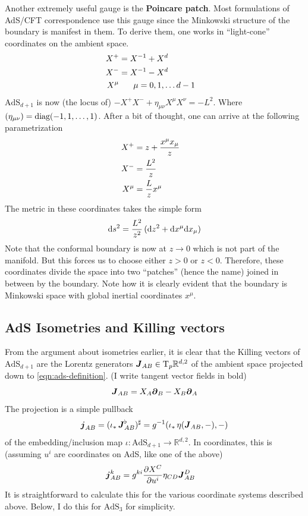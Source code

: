 \documentclass[a4paper,12pt]{article}
\begin{document}
      Another extremely useful gauge is the \textbf{Poincare patch}. Most formulations of AdS/CFT correspondence use this gauge since the Minkowski structure of the boundary is manifest in them. To derive them, one works in ``light-cone'' coordinates on the ambient space.
      \begin{align}
         X^+ &= X^{-1} + X^d \cr
         X^- &= X^{-1} - X^d \cr
         X^\mu &\hspace{0.05\linewidth} \mu = 0, 1, \ldots d-1
      \end{align}
      $\text{AdS}_{d+1}$ is now (the locus of) $-X^{+}X^{-} + \eta_{\mu \nu} X^\mu X^\nu = -L^2$. Where $(\eta_{\mu \nu}) = \hbox{\rm diag} (-1, 1, \ldots, 1)$.
      After a bit of thought, one can arrive at the following parametrization
      \begin{align}
         X^{+} &= z + \frac{x^\mu x_\mu}{z} \cr
         X^{-} &= \frac{L^2}{z} \cr
         X^{\mu} &= \frac{L}{z} x^\mu
      \end{align}
      The metric in these coordinates takes the simple form
      \begin{equation}
         \text{d} s^2 = \frac{L^2}{z^2} \, (\text{d} z^2 + \text{d} x^\mu \text{d} x_\mu)
      \end{equation}
      Note that the conformal boundary is now at $z \to 0$ which is not part of the manifold. But this forces us to choose either $z > 0$ or $z < 0$. Therefore, these coordinates divide the space into two ``patches'' (hence the name) joined in between by the boundary.
      Note how it is clearly evident that the boundary is Minkowski space with global inertial coordinates $x^\mu$.

   \subsection{AdS Isometries and Killing vectors}
      From the argument about isometries earlier, it is clear that the Killing vectors of $\text{AdS}_{d+1}$ are the Lorentz generators $\boldsymbol{J}_{A B} \in \text{T}_{p} \mathbb{R}^{d, 2}$ of the ambient space projected down to \ref{eqn:ads-definition}. (I write tangent vector fields in bold)
      \begin{equation}
         \boldsymbol{J}_{A B} = X_A \boldsymbol{\partial}_B - X_B \boldsymbol{\partial}_A
      \end{equation}
      The projection is a simple pullback
      \begin{equation}
         \boldsymbol{j}_{A B} = (\iota_* \, \boldsymbol{J}_{A B}^{\flat})^{\sharp} = g^{-1}( \iota_* \, \eta(\boldsymbol{J}_{A B}, -), -)
      \end{equation}
      of the embedding/inclusion map $\iota \colon \text{AdS}_{d+1} \to \mathbb{R}^{d, 2}$. In coordinates, this is (assuming $u^i$ are coordinates on AdS, like one of the above)
      \begin{align}
         \boldsymbol{j}_{A B}^{k} &= g^{k i} \pdv{X^C}{u^i} \eta_{C D} \boldsymbol{J}_{A B}^{D} \boldsymbol{}
      \end{align}
      It is straightforward to calculate this for the various coordinate systems described above.
      Below, I do this for $\text{AdS}_3$ for simplicity.
\end{document}
